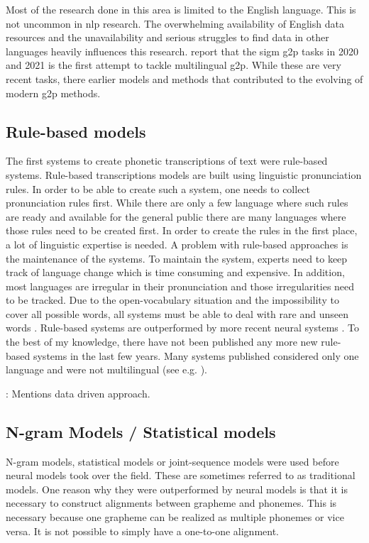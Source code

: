 Most of the research done in this area is limited to the English language. This is not uncommon in \ac{nlp} research. The overwhelming availability of English data resources and the unavailability and serious struggles to find data in other languages heavily influences this research. \citet{Ashby&Bartley.2021} report that the \ac{sigm} \ac{g2p} tasks in 2020 and 2021 is the first attempt to tackle multilingual \ac{g2p}. While these are very recent tasks, there earlier models and methods that contributed to the evolving of modern \ac{g2p} methods.

\subsection{Rule-based models}
The first systems to create phonetic transcriptions of text were rule-based systems. Rule-based transcriptions models are built using linguistic pronunciation rules. In order to be able to create such a system, one needs to collect pronunciation rules first. While there are only a few language where such rules are ready and available for the general public there are many languages where those rules need to be created first. In order to create the rules in the first place, a lot of linguistic expertise is needed. A problem with rule-based approaches is the maintenance of the systems. To maintain the system, experts need to keep track of language change which is time consuming and expensive. In addition, most languages are irregular in their pronunciation and those irregularities need to be tracked. Due to the open-vocabulary situation and the impossibility to cover all possible words, all systems must be able to deal with rare and unseen words \citep{Rao2015GraphemetophonemeCU, ney-joint-sequence2008}. Rule-based systems are outperformed by more recent neural systems \citep{gorman-etal-2020-sigmorphon, Ashby&Bartley.2021}. 
To the best of my knowledge, there have not been published any more new rule-based systems in the last few years. Many systems published considered only one language and were not multilingual (see e.g. \citet{rule-based2009}).

\citep{Rao2015GraphemetophonemeCU}

\citep{ney-joint-sequence2008}: Mentions data driven approach. 


\subsection{N-gram Models / Statistical models}
N-gram models, statistical models or joint-sequence models were used before neural models took over the field. These are sometimes referred to as traditional models. One reason why they were outperformed by neural models is that it is necessary to construct alignments between grapheme and phonemes. This is necessary because one grapheme can be realized as multiple phonemes or vice versa. It is not possible to simply have a one-to-one alignment. 


